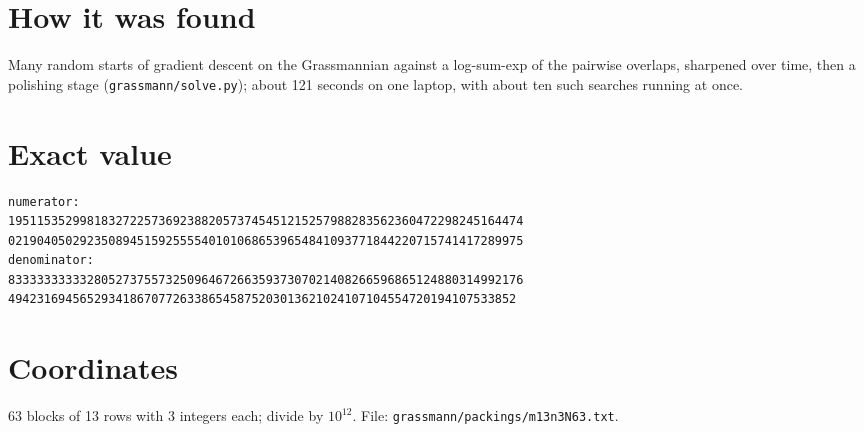 \documentclass[11pt,a4paper]{article}
\begin{document}
\section{How it was found}
Many random starts of gradient descent on the Grassmannian against a log-sum-exp of the pairwise overlaps, sharpened over time, then a polishing stage (\texttt{grassmann/solve.py}); about 121 seconds on one laptop, with about ten such searches running at once.


\appendix
\section{Exact value}
{\small
\begin{verbatim}
numerator:
195115352998183272257369238820573745451215257988283562360472298245164474
021904050292350894515925555401010686539654841093771844220715741417289975
denominator:
833333333332805273755732509646726635937307021408266596865124880314992176
49423169456529341867077263386545875203013621024107104554720194107533852
\end{verbatim}}

\section{Coordinates}
63 blocks of 13 rows with 3 integers each; divide by $10^{12}$. File: \texttt{grassmann/packings/m13n3N63.txt}.
{\tiny
\begin{multicols}{3}
\end{multicols}}
\end{document}
